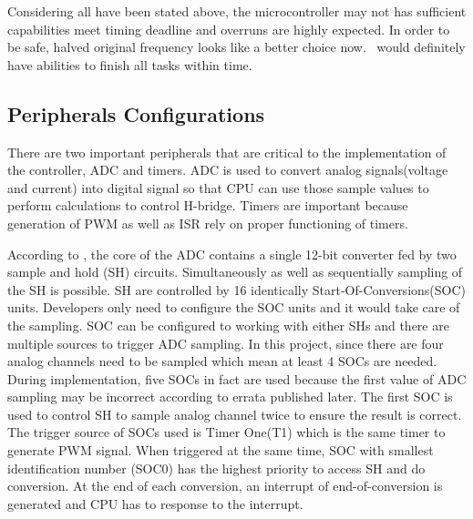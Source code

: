Considering all have been stated above, the microcontroller may not has sufficient capabilities meet timing deadline and overruns are highly expected. In order to be safe, halved original frequency looks like a better choice now. \tms~would definitely have abilities to finish all tasks within time.

\subsection{Peripherals Configurations}
There are two important peripherals that are critical to the implementation of the controller, \gls{ADC} and timers. \gls{ADC}
is used to convert analog signals(voltage and current) into digital signal so that \gls{CPU} can use those sample values to perform calculations to control H-bridge. Timers are important because generation of \gls{PWM} as well as ISR rely on proper functioning of timers. 

According to \cite{adc_ref}, the core of the \gls{ADC} contains a single 12-bit converter fed by two sample and hold (SH) circuits. Simultaneously as well as sequentially sampling of the SH is possible. SH are controlled by 16 identically Start-Of-Conversions(SOC) units. Developers only need to configure the SOC units and it would take care of the sampling. SOC can be configured to working with either SHs and there are multiple sources to trigger \gls{ADC} sampling. In this project, since there are four analog channels need to be sampled which mean at least 4 SOCs are needed. During implementation, five SOCs in fact are used because the first value of ADC sampling may be incorrect according to errata\cite{tms_errata} published later. The first SOC is used to control SH to sample analog channel twice to ensure the result is correct. The trigger source of SOCs used is Timer One(T1) which is the same timer to generate \gls{PWM} signal. When triggered at the same time, SOC with smallest identification number (SOC0) has the highest priority to access SH and do conversion. At the end of each conversion, an interrupt of end-of-conversion is generated and \gls{CPU} has to response to the interrupt. 

